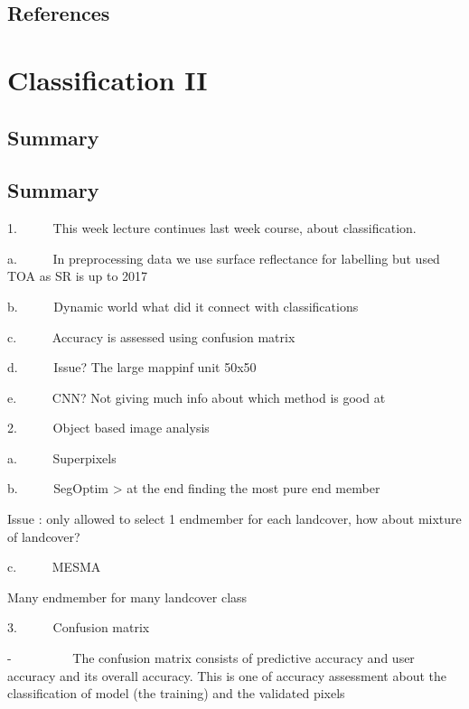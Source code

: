 \documentclass[
  letterpaper,
  DIV=11,
  numbers=noendperiod]{scrreprt}
\begin{document}
\hypertarget{references-3}{%
\section{References}\label{references-3}}


\hypertarget{classification-ii}{%
\chapter{Classification II}\label{classification-ii}}

\hypertarget{summary-6}{%
\section{Summary}\label{summary-6}}

\hypertarget{summary-7}{%
\section{Summary}\label{summary-7}}

1.~~~~~ This week lecture continues last week course, about
classification.

a.~~~~~ In preprocessing data we use surface reflectance for labelling
but used TOA as SR is up to 2017

b.~~~~~ Dynamic world what did it connect with classifications

c.~~~~~ Accuracy is assessed using confusion matrix

d.~~~~~ Issue? The large mappinf unit 50x50

e.~~~~~ CNN? Not giving much info about which method is good at

2.~~~~~ Object based image analysis

a.~~~~~ Superpixels

b.~~~~~ SegOptim \textgreater{} at the end finding the most pure end
member

Issue : only allowed to select 1 endmember for each landcover, how about
mixture of landcover?

c.~~~~~ MESMA

Many endmember for many landcover class

3.~~~~~ Confusion matrix

-~~~~~~~~~ The confusion matrix consists of predictive accuracy and user
accuracy and its overall accuracy. This is one of accuracy assessment
about the classification of model (the training) and the validated
pixels
\end{document}

